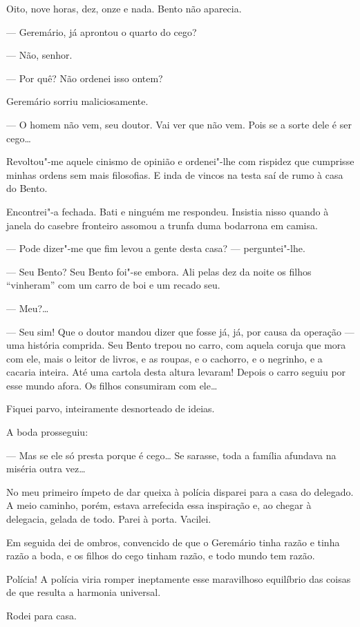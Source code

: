 Oito, nove horas, dez, onze e nada. Bento não aparecia.

--- Geremário, já aprontou o quarto do cego?

--- Não, senhor.

--- Por quê? Não ordenei isso ontem?

Geremário sorriu maliciosamente.

--- O homem não vem, seu doutor. Vai ver que não vem. Pois se a sorte
dele é ser cego\ldots{}

Revoltou"-me aquele cinismo de opinião e ordenei"-lhe com rispidez que
cumprisse minhas ordens sem mais filosofias. E inda de vincos na testa
saí de rumo à casa do Bento.

Encontrei"-a fechada. Bati e ninguém me respondeu. Insistia nisso quando
à janela do casebre fronteiro assomou a trunfa duma bodarrona em camisa.

--- Pode dizer"-me que fim levou a gente desta casa? --- perguntei"-lhe.

--- Seu Bento? Seu Bento foi"-se embora. Ali pelas dez da noite os filhos
``vinheram'' com um carro de boi e um recado seu.

--- Meu?\ldots{}

--- Seu sim! Que o doutor mandou dizer que fosse já, já, por causa da
operação --- uma história comprida. Seu Bento trepou no carro, com
aquela coruja que mora com ele, mais o leitor de livros, e as roupas, e
o cachorro, e o negrinho, e a cacaria inteira. Até uma cartola desta
altura levaram! Depois o carro seguiu por esse mundo afora. Os filhos
consumiram com ele\ldots{}

Fiquei parvo, inteiramente desnorteado de ideias.

A boda prosseguiu:

--- Mas se ele só presta porque é cego\ldots{} Se sarasse, toda a família
afundava na miséria outra vez\ldots{}

No meu primeiro ímpeto de dar queixa à polícia disparei para a casa do
delegado. A meio caminho, porém, estava arrefecida essa inspiração e, ao
chegar à delegacia, gelada de todo. Parei à porta. Vacilei.

Em seguida dei de ombros, convencido de que o Geremário tinha razão e
tinha razão a boda, e os filhos do cego tinham razão, e todo mundo tem
razão.

Polícia! A polícia viria romper ineptamente esse maravilhoso equilíbrio
das coisas de que resulta a harmonia universal.

Rodei para casa.


